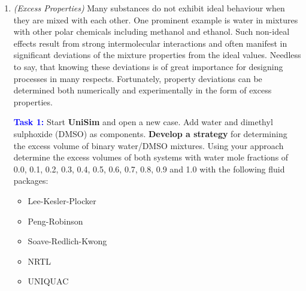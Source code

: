 \documentclass[12pts,a4paper,amsmath,amssymb,floatfix]{article}%
\begin{document}
\begin{enumerate}[label=\bfseries Problem \arabic*]
%
\item\label{ExcessVolume} {\it (Excess Properties)} Many substances do not exhibit ideal behaviour when they are mixed with each other. One prominent example is water in mixtures with other polar chemicals including methanol and ethanol. Such non-ideal effects result from strong intermolecular interactions and often manifest in significant deviations of the mixture properties from the ideal values. Needless to say, that knowing these deviations is of great importance for designing processes in many respects. Fortunately, property deviations can be determined both numerically and experimentally in the form of excess properties. 

{\bf \textcolor{blue}{Task 1:}} Start {\bf UniSim} and open a new case. Add water and dimethyl sulphoxide (DMSO) as components. {\bf Develop a strategy} for determining the excess volume of binary water/DMSO mixtures. Using your approach determine the excess volumes of both systems with water mole fractions of 0.0, 0.1, 0.2, 0.3, 0.4, 0.5, 0.6, 0.7, 0.8, 0.9 and 1.0 with the following fluid packages:
\begin{itemize}
\item Lee-Kesler-Plocker
\item Peng-Robinson
\item Soave-Redlich-Kwong
\item NRTL
\item UNIQUAC
\end{itemize}


\end{enumerate}
\end{document}
